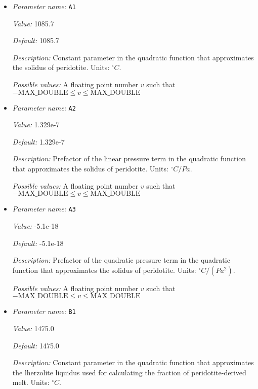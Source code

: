 \begin{itemize}
\item {\it Parameter name:} {\tt A1}
\label{parameters:Material model/Melt simple/A1}


{\it Value:} 1085.7


{\it Default:} 1085.7


{\it Description:} Constant parameter in the quadratic function that approximates the solidus of peridotite. Units: ${}^\circ C$.


{\it Possible values:} A floating point number $v$ such that $-\text{MAX\_DOUBLE} \leq v \leq \text{MAX\_DOUBLE}$
\item {\it Parameter name:} {\tt A2}
\label{parameters:Material model/Melt simple/A2}


{\it Value:} 1.329e-7


{\it Default:} 1.329e-7


{\it Description:} Prefactor of the linear pressure term in the quadratic function that approximates the solidus of peridotite. Units: ${}^\circ C/Pa$.


{\it Possible values:} A floating point number $v$ such that $-\text{MAX\_DOUBLE} \leq v \leq \text{MAX\_DOUBLE}$
\item {\it Parameter name:} {\tt A3}
\label{parameters:Material model/Melt simple/A3}


{\it Value:} -5.1e-18


{\it Default:} -5.1e-18


{\it Description:} Prefactor of the quadratic pressure term in the quadratic function that approximates the solidus of peridotite. Units: ${}^\circ C/(Pa^2)$.


{\it Possible values:} A floating point number $v$ such that $-\text{MAX\_DOUBLE} \leq v \leq \text{MAX\_DOUBLE}$
\item {\it Parameter name:} {\tt B1}
\label{parameters:Material model/Melt simple/B1}


{\it Value:} 1475.0


{\it Default:} 1475.0


{\it Description:} Constant parameter in the quadratic function that approximates the lherzolite liquidus used for calculating the fraction of peridotite-derived melt. Units: ${}^\circ C$.



\end{itemize}
